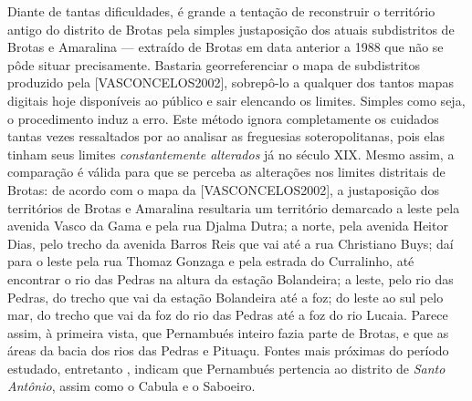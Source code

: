Diante de tantas dificuldades, é grande a tentação de reconstruir o território antigo do distrito de Brotas pela simples justaposição dos atuais subdistritos de Brotas e Amaralina --- extraído de Brotas em data anterior a 1988 que não se pôde situar precisamente. Bastaria georreferenciar o mapa de subdistritos produzido pela [VASCONCELOS2002], sobrepô-lo a qualquer dos tantos mapas digitais hoje disponíveis ao público e sair elencando os limites. Simples como seja, o procedimento induz a erro. Este método ignora completamente os cuidados tantas vezes ressaltados por  ao analisar as freguesias soteropolitanas, pois elas tinham seus limites \textit{constantemente alterados} já no século XIX. Mesmo assim, a comparação é válida para que se perceba as alterações nos limites distritais de Brotas: de acordo com o mapa da [VASCONCELOS2002], a justaposição dos territórios de Brotas e Amaralina resultaria um território demarcado a leste pela avenida Vasco da Gama e pela rua Djalma Dutra; a norte, pela avenida Heitor Dias, pelo trecho da avenida Barros Reis que vai até a rua Christiano Buys; daí para o leste pela rua Thomaz Gonzaga e pela estrada do Curralinho, até encontrar o rio das Pedras na altura da estação Bolandeira; a leste, pelo rio das Pedras, do trecho que vai da estação Bolandeira até a foz; do leste ao sul pelo mar, do trecho que vai da foz do rio das Pedras até a foz do rio Lucaia. Parece assim, à primeira vista, que Pernambués inteiro fazia parte de Brotas, e que as áreas da bacia dos rios das Pedras e Pituaçu. Fontes mais próximas do período estudado, entretanto \cite{souza_guia_1935}, indicam que Pernambués pertencia ao distrito de \textit{Santo Antônio}, assim como o Cabula e o Saboeiro.